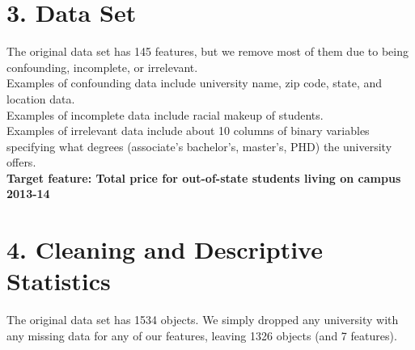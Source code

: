 \documentclass[12pt, a4, epsf] {article}
\theoremstyle{plain}
\theoremstyle{definition}
\begin{document}
\section*{3. Data Set}
The original data set has 145 features, but we remove most of them due to being confounding, incomplete, or irrelevant.\\
Examples of confounding data include university name, zip code, state, and location data.\\
Examples of incomplete data include racial makeup of students.\\
Examples of irrelevant data include about 10 columns of binary variables specifying what degrees (associate's bachelor's, master's, PHD) the university offers.\\
\textbf{Target feature: Total price for out-of-state students living on campus 2013-14}
\section*{4. Cleaning and Descriptive Statistics}
The original data set has 1534 objects. We simply dropped any university with any missing data for any of our features, leaving 1326 objects (and 7 features).
\end{document}
